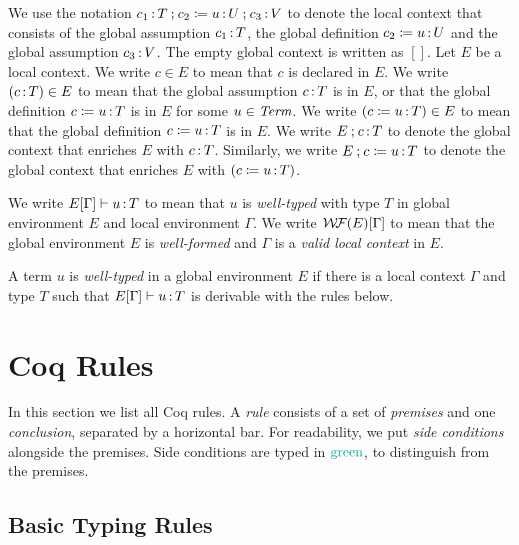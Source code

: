 \documentclass{article}
\begin{document}
\begin{notation}
We use the notation $c_1 {\,:\,} T \mathbin{;} c_2 \coloneqq u {\,:\,} U \mathbin{;} c_3 {\,:\,} V$
to denote the local context that consists of
the global assumption $c_1 {\,:\,} T$,
the global definition $c_2 \coloneqq u {\,:\,} U$
and the global assumption $c_3 {\,:\,} V$.
The empty global context is written as $[]$. %
Let $E$ be a local context. 
We write $c \in E$ to mean that $c$ is declared in $E$.
We write $(c {\,:\,} T) \in E$ to mean that the global assumption
$c {\,:\,} T$ is in $E$, or that
the global definition $c \coloneqq u {\,:\,} T$ is in $E$ for some $u \in \textnormal{\textit{Term}}$.
We write $(c \coloneqq u {\,:\,} T) \in E$ to mean that
the global definition $c \coloneqq u {\,:\,} T$ is in $E$.
We write $E \mathbin{;} c {\,:\,} T$ to denote the global context
that enriches $E$ with $c {\,:\,} T$.
Similarly, we write 
$E \mathbin{;} c \coloneqq u {\,:\,} T$ to denote the global context
that enriches $E$ with $( c \coloneqq u {\,:\,} T )$.
\end{notation}

\begin{notation}
We write $E[\Gamma] \vdash u {\,:\,} T$ to mean that $u$ is \emph{well-typed} 
with type $T$ in global environment $E$ and local environment $\Gamma$.
We write $\mathcal{W\!F}(E)[\Gamma]$ to mean that the global environment $E$ is 
\emph{well-formed}
and $\Gamma$ is a \emph{valid local context} in $E$.
\end{notation}

\begin{definition}
A term $u$ is \emph{well-typed} in a global environment $E$ if there is a
local context $\Gamma$ and type $T$ such that
$E[\Gamma] \vdash u {\,:\,} T$ is derivable with the rules below.
\end{definition}

\section{Coq Rules}

In this section we list all Coq rules. 
A \emph{rule} consists of a set of \emph{premises} and one \emph{conclusion},
separated by a horizontal bar.
For readability, we put \emph{side conditions} alongside the premises.
Side conditions are typed in $\sd{\text{green}}$, to distinguish
from the premises.


\subsection{Basic Typing Rules}
\end{document}
